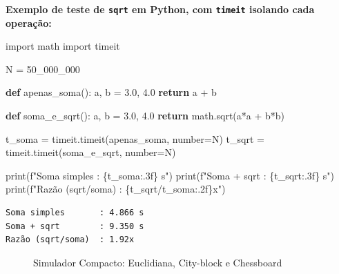 \documentclass[
  portuguese,
  letterpaper,
  openany,
  oneside,
  12pt,
  a4paper]{book}
\newenvironment{Shaded}{\begin{snugshade}}{\end{snugshade}}
\newcommand{\BuiltInTok}[1]{\textcolor[rgb]{0.00,0.23,0.31}{#1}}
\newcommand{\ControlFlowTok}[1]{\textcolor[rgb]{0.00,0.23,0.31}{\textbf{#1}}}
\newcommand{\DecValTok}[1]{\textcolor[rgb]{0.68,0.00,0.00}{#1}}
\newcommand{\FloatTok}[1]{\textcolor[rgb]{0.68,0.00,0.00}{#1}}
\newcommand{\ImportTok}[1]{\textcolor[rgb]{0.00,0.46,0.62}{#1}}
\newcommand{\KeywordTok}[1]{\textcolor[rgb]{0.00,0.23,0.31}{\textbf{#1}}}
\newcommand{\NormalTok}[1]{\textcolor[rgb]{0.00,0.23,0.31}{#1}}
\newcommand{\OperatorTok}[1]{\textcolor[rgb]{0.37,0.37,0.37}{#1}}
\newcommand{\SpecialCharTok}[1]{\textcolor[rgb]{0.37,0.37,0.37}{#1}}
\newcommand{\SpecialStringTok}[1]{\textcolor[rgb]{0.13,0.47,0.30}{#1}}
\begin{document}
\textbf{Exemplo de teste de \texttt{sqrt} em Python, com \texttt{timeit}
isolando cada operação:}

\begin{Shaded}
\begin{Highlighting}[]
\ImportTok{import}\NormalTok{ math}
\ImportTok{import}\NormalTok{ timeit}

\NormalTok{N }\OperatorTok{=} \DecValTok{50\_000\_000}

\KeywordTok{def}\NormalTok{ apenas\_soma():}
\NormalTok{    a, b }\OperatorTok{=} \FloatTok{3.0}\NormalTok{, }\FloatTok{4.0}
    \ControlFlowTok{return}\NormalTok{ a }\OperatorTok{+}\NormalTok{ b}

\KeywordTok{def}\NormalTok{ soma\_e\_sqrt():}
\NormalTok{    a, b }\OperatorTok{=} \FloatTok{3.0}\NormalTok{, }\FloatTok{4.0}
    \ControlFlowTok{return}\NormalTok{ math.sqrt(a}\OperatorTok{*}\NormalTok{a }\OperatorTok{+}\NormalTok{ b}\OperatorTok{*}\NormalTok{b)}

\NormalTok{t\_soma }\OperatorTok{=}\NormalTok{ timeit.timeit(apenas\_soma, number}\OperatorTok{=}\NormalTok{N)}
\NormalTok{t\_sqrt }\OperatorTok{=}\NormalTok{ timeit.timeit(soma\_e\_sqrt, number}\OperatorTok{=}\NormalTok{N)}

\BuiltInTok{print}\NormalTok{(}\SpecialStringTok{f"Soma simples       : }\SpecialCharTok{\{}\NormalTok{t\_soma}\SpecialCharTok{:.3f\}}\SpecialStringTok{ s"}\NormalTok{)}
\BuiltInTok{print}\NormalTok{(}\SpecialStringTok{f"Soma + sqrt        : }\SpecialCharTok{\{}\NormalTok{t\_sqrt}\SpecialCharTok{:.3f\}}\SpecialStringTok{ s"}\NormalTok{)}
\BuiltInTok{print}\NormalTok{(}\SpecialStringTok{f"Razão (sqrt/soma)  : }\SpecialCharTok{\{}\NormalTok{t\_sqrt}\OperatorTok{/}\NormalTok{t\_soma}\SpecialCharTok{:.2f\}}\SpecialStringTok{x"}\NormalTok{)}
\end{Highlighting}
\end{Shaded}

\begin{verbatim}
Soma simples       : 4.866 s
Soma + sqrt        : 9.350 s
Razão (sqrt/soma)  : 1.92x
\end{verbatim}

\begin{figure}


\caption{\label{fig-01-metricas-distancia}Simulador Compacto:
Euclidiana, City-block e Chessboard}

\end{figure}%
\end{document}
